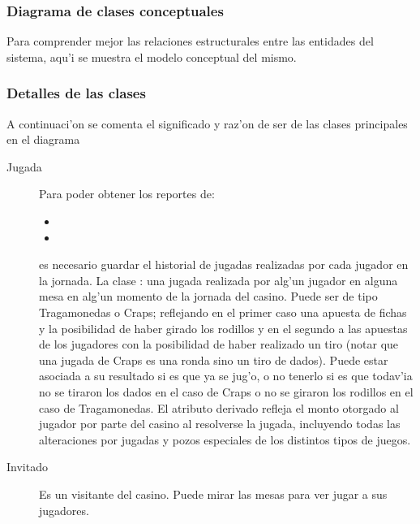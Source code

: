 \subsubsection{Diagrama de clases conceptuales}
Para comprender mejor las relaciones estructurales entre las entidades del sistema, aqu'i se muestra el modelo conceptual del mismo. 



\subsubsection{Detalles de las clases}
A continuaci'on se comenta el significado y raz'on de ser de las clases principales en el diagrama
\begin{description}
\item [Jugada] Para poder obtener los reportes de:
\begin{itemize}
 \item {} 
\item {} 
\end{itemize}
 es necesario guardar el historial de jugadas realizadas por cada jugador en la jornada. 
La clase : una jugada realizada por alg'un jugador en alguna mesa en alg'un momento de la jornada del casino. Puede ser de tipo Tragamonedas o Craps; reflejando en el primer caso una apuesta de fichas y la posibilidad de haber girado los rodillos y en el segundo a las apuestas de los jugadores con la posibilidad de haber realizado un tiro (notar que una jugada de Craps  es una ronda sino un tiro de dados). Puede estar asociada a su resultado si es que ya se jug'o, o no tenerlo si es que todav'ia no se tiraron los dados en el caso de Craps o no se giraron los rodillos en el caso de Tragamonedas.
El atributo derivado  refleja el monto otorgado al jugador por parte del casino al resolverse la jugada, incluyendo todas las alteraciones por jugadas y pozos especiales de los distintos tipos de juegos.

\item [Invitado] Es un visitante del casino. Puede mirar las mesas para ver jugar a sus jugadores.


\end{description}
